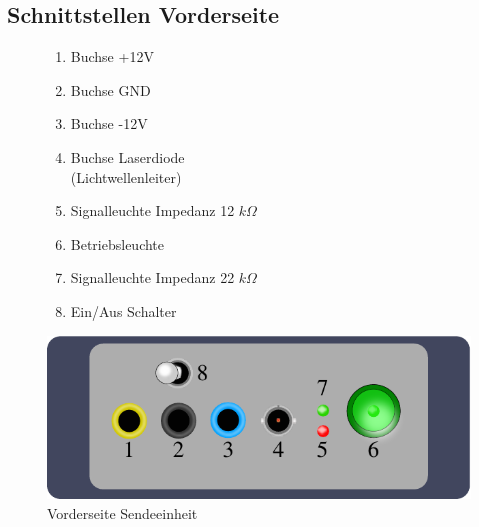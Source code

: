 \documentclass[10pt,a4paper]{scrartcl}
\begin{document}
\subsection{Schnittstellen Vorderseite}
\begin{figure}[H]
\begin{minipage}[t]{6cm}
\vspace{0pt}

\begin{enumerate}
\item Buchse +12V
\item Buchse GND
\item Buchse -12V
\item Buchse Laserdiode \\(Lichtwellenleiter)
\item Signalleuchte Impedanz 12 $k\Omega$
\item Betriebsleuchte
\item Signalleuchte Impedanz 22 $k\Omega$
\item Ein/Aus Schalter 
\end{enumerate}
\end{minipage}
\hfill
\begin{minipage}[t]{6.5cm}
\vspace{0pt}
\centering
\includegraphics[scale=0.7]{gfx/tx-front.pdf}
\caption{Vorderseite Sendeeinheit}
\label{fig:tx-front}
\end{minipage}
\end{figure}
\end{document}
